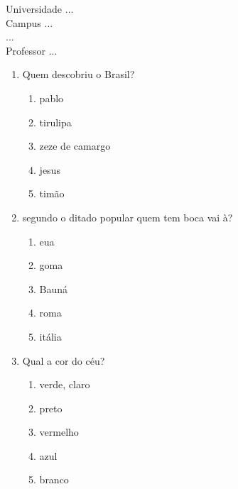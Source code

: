 \documentclass[10pt,a4paper,twocolumn]{report}
\begin{document}
\begin{flushleft}
Universidade ...\\
Campus ...\\
...\\
Professor ...\\
\end{flushleft}




 \begin{enumerate} 
    \item  Quem descobriu o Brasil?





    \begin{enumerate}
    \item  pablo

\item  tirulipa

\item  zeze de camargo

\item  jesus

\item  timão


    \end{enumerate} 
    \item  segundo o ditado popular quem tem boca vai à?





    \begin{enumerate}
    \item  eua

\item  goma

\item  Bauná

\item  roma

\item  itália


    \end{enumerate} 
    \item  Qual a cor do céu?





    \begin{enumerate}
    \item  verde, claro

\item  preto

\item  vermelho

\item  azul

\item  branco


    \end{enumerate}\end{enumerate} 
\end{document}
